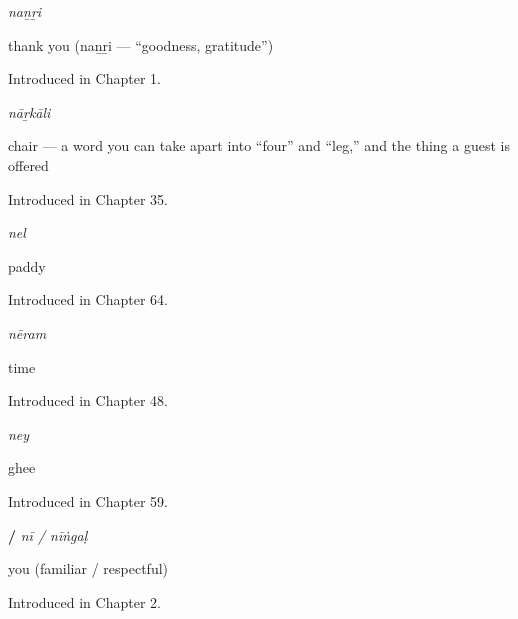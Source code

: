 \noindent\begin{minipage}[t]{\linewidth}
\raggedright
\textbf{}\enspace\emph{naṉṟi}\par
\small thank you (naṉṟi — \textquotedblleft{}goodness, gratitude\textquotedblright{})\par
\footnotesize Introduced in Chapter 1.
\end{minipage}\par\medskip

\noindent\begin{minipage}[t]{\linewidth}
\raggedright
\textbf{}\enspace\emph{nāṟkāli}\par
\small chair — a word you can take apart into \textquotedblleft{}four\textquotedblright{} and \textquotedblleft{}leg,\textquotedblright{} and the thing a guest is offered\par
\footnotesize Introduced in Chapter 35.
\end{minipage}\par\medskip

\noindent\begin{minipage}[t]{\linewidth}
\raggedright
\textbf{}\enspace\emph{nel}\par
\small paddy\par
\footnotesize Introduced in Chapter 64.
\end{minipage}\par\medskip

\noindent\begin{minipage}[t]{\linewidth}
\raggedright
\textbf{}\enspace\emph{nēram}\par
\small time\par
\footnotesize Introduced in Chapter 48.
\end{minipage}\par\medskip

\noindent\begin{minipage}[t]{\linewidth}
\raggedright
\textbf{}\enspace\emph{ney}\par
\small ghee\par
\footnotesize Introduced in Chapter 59.
\end{minipage}\par\medskip

\noindent\begin{minipage}[t]{\linewidth}
\raggedright
\textbf{ / }\enspace\emph{nī / nīṅgaḷ}\par
\small you (familiar / respectful)\par
\footnotesize Introduced in Chapter 2.
\end{minipage}\par\medskip

